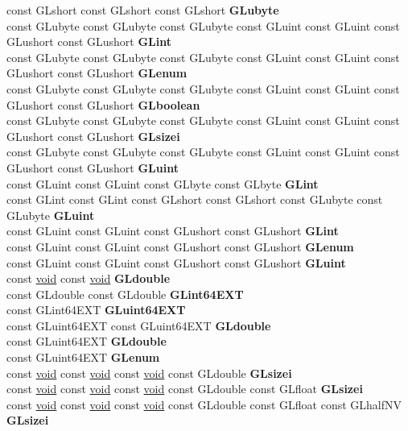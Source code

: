\begin{DoxyCompactItemize}
\begin{tabbing}
\>const GLshort const GLshort const GLshort {\bfseries GLubyte}\\
\>const GLubyte const GLubyte const GLubyte const GLuint const GLuint const GLushort const GLushort {\bfseries GLint}\\
\>const GLubyte const GLubyte const GLubyte const GLuint const GLuint const GLushort const GLushort {\bfseries GLenum}\\
\>const GLubyte const GLubyte const GLubyte const GLuint const GLuint const GLushort const GLushort {\bfseries GLboolean}\\
\>const GLubyte const GLubyte const GLubyte const GLuint const GLuint const GLushort const GLushort {\bfseries GLsizei}\\
\>const GLubyte const GLubyte const GLubyte const GLuint const GLuint const GLushort const GLushort {\bfseries GLuint}\\
\>const GLuint const GLuint const GLbyte const GLbyte {\bfseries GLint}\\
\>const GLint const GLint const GLshort const GLshort const GLubyte const GLubyte {\bfseries GLuint}\\
\>const GLuint const GLuint const GLushort const GLushort {\bfseries GLint}\\
\>const GLuint const GLuint const GLushort const GLushort {\bfseries GLenum}\\
\>const GLuint const GLuint const GLushort const GLushort {\bfseries GLuint}\\
\>const \hyperlink{interfacevoid}{void} const \hyperlink{interfacevoid}{void} {\bfseries GLdouble}\\
\>const GLdouble const GLdouble {\bfseries GLint64EXT}\\
\>const GLint64EXT {\bfseries GLuint64EXT}\\
\>const GLuint64EXT const GLuint64EXT {\bfseries GLdouble}\\
\>const GLuint64EXT {\bfseries GLdouble}\\
\>const GLuint64EXT {\bfseries GLenum}\\
\>const \hyperlink{interfacevoid}{void} const \hyperlink{interfacevoid}{void} const \hyperlink{interfacevoid}{void} const GLdouble {\bfseries GLsizei}\\
\>const \hyperlink{interfacevoid}{void} const \hyperlink{interfacevoid}{void} const \hyperlink{interfacevoid}{void} const GLdouble const GLfloat {\bfseries GLsizei}\\
\>const \hyperlink{interfacevoid}{void} const \hyperlink{interfacevoid}{void} const \hyperlink{interfacevoid}{void} const GLdouble const GLfloat const GLhalfNV {\bfseries GLsizei}\\

\end{tabbing}
\end{DoxyCompactItemize}
